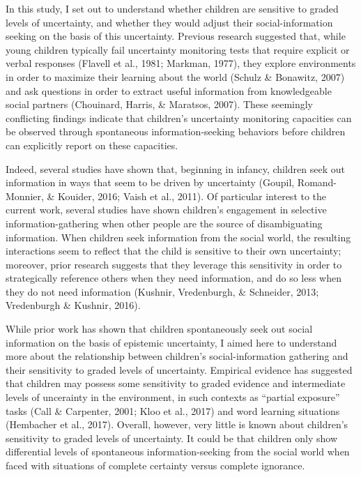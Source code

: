 \documentclass[floatsintext,man]{apa6}
\theoremstyle{definition}
\theoremstyle{definition}
\theoremstyle{definition}
\theoremstyle{remark}
\begin{document}
In this study, I set out to understand whether children are sensitive to
graded levels of uncertainty, and whether they would adjust their
social-information seeking on the basis of this uncertainty. Previous
research suggested that, while young children typically fail uncertainty
monitoring tests that require explicit or verbal responses (Flavell et
al., 1981; Markman, 1977), they explore environments in order to
maximize their learning about the world (Schulz \& Bonawitz, 2007) and
ask questions in order to extract useful information from knowledgeable
social partners (Chouinard, Harris, \& Maratsos, 2007). These seemingly
conflicting findings indicate that children's uncertainty monitoring
capacities can be observed through spontaneous information-seeking
behaviors before children can explicitly report on these capacities.

Indeed, several studies have shown that, beginning in infancy, children
seek out information in ways that seem to be driven by uncertainty
(Goupil, Romand-Monnier, \& Kouider, 2016; Vaish et al., 2011). Of
particular interest to the current work, several studies have shown
children's engagement in selective information-gathering when other
people are the source of disambiguating information. When children seek
information from the social world, the resulting interactions seem to
reflect that the child is sensitive to their own uncertainty; moreover,
prior research suggests that they leverage this sensitivity in order to
strategically reference others when they need information, and do so
less when they do not need information (Kushnir, Vredenburgh, \&
Schneider, 2013; Vredenburgh \& Kushnir, 2016).

While prior work has shown that children spontaneously seek out social
information on the basis of epistemic uncertainty, I aimed here to
understand more about the relationship between children's
social-information gathering and their sensitivity to graded levels of
uncertainty. Empirical evidence has suggested that children may possess
some sensitivity to graded evidence and intermediate levels of
uncerainty in the environment, in such contexts as \enquote{partial
exposure} tasks (Call \& Carpenter, 2001; Kloo et al., 2017) and word
learning situations (Hembacher et al., 2017). Overall, however, very
little is known about children's sensitivity to graded levels of
uncertainty. It could be that children only show differential levels of
spontaneous information-seeking from the social world when faced with
situations of complete certainty versus complete ignorance.
\end{document}
